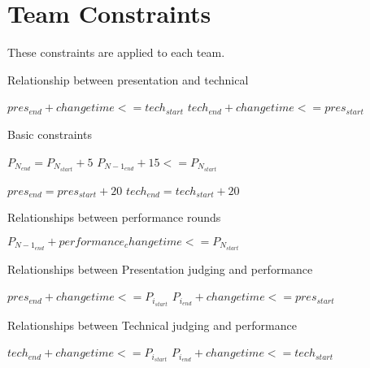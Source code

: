 \documentclass[letterpaper,11pt]{report}
\begin{document}
\section{Team Constraints}
These constraints are applied to each team.

\begin{algorithm}
\caption{Relationship between presentation and technical}
\begin{algorithmic}
  \STATE $pres_{end} + changetime <= tech_{start}$
\ELSE
  \STATE $tech_{end} + changetime <= pres_{start}$
\ENDIF
\end{algorithmic}
\end{algorithm}

\begin{algorithm}
\caption{Basic constraints}
\begin{algorithmic}
  \STATE $P_{N_{end}} = P_{N_{start}} + 5$
\ENDFOR
{}
  \STATE $P_{{N-1}_{end}} + 15 <= P_{N_{start}}$
\ENDFOR

\STATE $pres_{end} = pres_{start} + 20$
\STATE $tech_{end} = tech_{start} + 20$
\end{algorithmic}
\end{algorithm}

\begin{algorithm}
\caption{Relationships between performance rounds}
\begin{algorithmic}
  \STATE $P_{{N-1}_{end}} + performance_changetime <= P_{N_{start}}$
\ENDFOR
\end{algorithmic}
\end{algorithm}

\begin{algorithm}
\caption{Relationships between Presentation judging and performance}
\begin{algorithmic}
    \STATE $pres_{end} + changetime <= P_{i_{start}}$
  \ELSE
    \STATE $P_{i_{end}} + changetime <= pres_{start}$
  \ENDIF
\ENDFOR
\end{algorithmic}
\end{algorithm}

\begin{algorithm}
\caption{Relationships between Technical judging and performance}
\begin{algorithmic}
    \STATE $tech_{end} + changetime <= P_{i_{start}}$
  \ELSE
    \STATE $P_{i_{end}} + changetime <= tech_{start}$
  \ENDIF
\ENDFOR
\end{algorithmic}
\end{algorithm}
\end{document}

